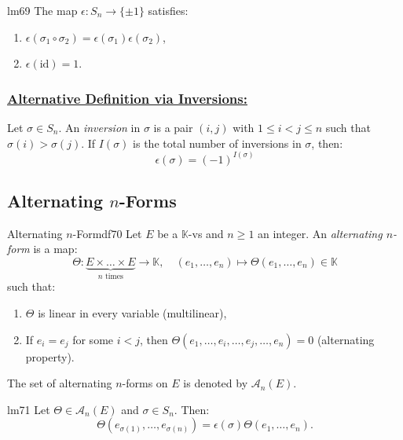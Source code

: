 \documentclass[11pt, a4paper]{article}
\newcommand{\K}{\mathbb{K}}
\begin{document}
\begin{lemma}{}{lm69}
  The map $\epsilon: S_n \to \{\pm 1\}$ satisfies:
  \begin{enumerate}
    \item $\epsilon(\sigma_1 \circ \sigma_2) = \epsilon(\sigma_1) \epsilon(\sigma_2)$,
    \item $\epsilon(\text{id}) = 1$.
  \end{enumerate}
\end{lemma}

\subsubsection*{\underline{Alternative Definition via Inversions:}}
Let $\sigma \in S_n$. An \emph{inversion} in $\sigma$ is a pair $(i, j)$ with $1 \le i < j \le n$ such that $\sigma(i) > \sigma(j)$.
If $I(\sigma)$ is the total number of inversions in $\sigma$, then:
\[
  \epsilon(\sigma) = (-1)^{I(\sigma)}
\]


\subsection{Alternating $n$-Forms}

\begin{definition}{Alternating $n$-Form}{df70}
  Let $E$ be a $\K$-vs and $n \ge 1$ an integer.
  An \emph{alternating $n$-form} is a map:
  \[
    \Theta: \underbrace{E \times \dots \times E}_{n \text{ times}} \longrightarrow \K, \quad (e_1, \dots, e_n) \longmapsto \Theta(e_1, \dots, e_n) \in \K
  \]
  such that:
  \begin{enumerate}
    \item $\Theta$ is linear in every variable (multilinear),
    \item If $e_i = e_j$ for some $i < j$, then $\Theta(e_1, \dots, e_i, \dots, e_j, \dots, e_n) = 0$ (alternating property).
  \end{enumerate}
  The set of alternating $n$-forms on $E$ is denoted by $\mathcal{A}_n(E)$.
\end{definition}

\begin{lemma}{}{lm71}
  Let $\Theta \in \mathcal{A}_n(E)$ and $\sigma \in S_n$. Then:
  \[
    \Theta(e_{\sigma(1)}, \dots, e_{\sigma(n)}) = \epsilon(\sigma) \Theta(e_1, \dots, e_n).
  \]
\end{lemma}
\end{document}

